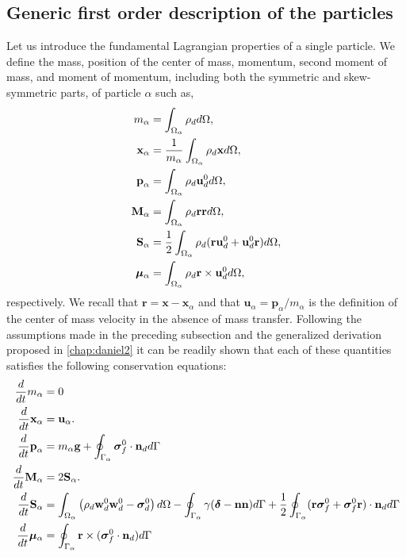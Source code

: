 
\subsection{Generic first order description of the particles}

Let us introduce the fundamental Lagrangian properties of a single particle. 
We define the mass, position of the center of mass, momentum, second moment of mass, and moment of momentum, including both the symmetric and skew-symmetric parts, of particle $\alpha$ such as, 
\begin{align}
    m_\alpha
    &= \intO{ \rho_d  },\\
    \textbf{x}_\alpha
    &= \frac{1}{m_\alpha }\intO{ \rho_d \textbf{x} },\\
    \textbf{p}_\alpha 
    &= \intO{ \rho_d \textbf{u}_d^0 },\\
    \textbf{M}_\alpha 
    &= \intO{ \rho_d \textbf{rr} }, \\
    \textbf{S}_\alpha 
    &= \frac{1}{2}\intO{ \rho_d (\textbf{r}\textbf{u}_d^0+\textbf{u}_d^0\textbf{r}) },\\
    \bm\mu_\alpha 
    &= \intO{ \rho_d \textbf{r}\times\textbf{u}_d^0 },
    \label{eq:position_and_momentum_def}
\end{align}
respectively. 
We recall that $\textbf{r} = \textbf{x} - \textbf{x}_\alpha$ and that $\textbf{u}_\alpha = \textbf{p}_\alpha /m_\alpha$ is the definition of the center of mass velocity in the absence of mass transfer. 
Following the assumptions made in the preceding subsection and the generalized derivation proposed in \ref{chap:daniel2} it can be readily shown that each of these quantities satisfies the following conservation equations:
\begin{align}
    \label{eq:dt_m_alpha}
    \ddt m_\alpha
    &= 
    0\\
    \ddt {\textbf{x}_\alpha}
    &=\textbf{u}_\alpha. 
    \label{eq:dt_x_alpha}\\
    \label{eq:dt_p_alpha}
    \ddt \textbf{p}_\alpha
    &= 
    m_\alpha\textbf{g}
    +  \intS{\bm{\sigma}_f^0 \cdot \textbf{n}_d}\\
    \ddt {\textbf{M}_\alpha}
    &=2\textbf{S}_\alpha. 
    \label{eq:dt_M_alpha}
    \\
    \ddt {\textbf{S}_\alpha}
    &= \intO{ \left(
        \rho_d  \textbf{w}_d^0 \textbf{w}_d^0 
        - \bm{\sigma}_d^0
    \right) }
    - \intS{ 
        \gamma (\bm\delta - \textbf{nn})
    }
    + \frac{1}{2}\intS{ (\textbf{r}\bm{\sigma}_f^0+\bm{\sigma}_f^0\textbf{r})\cdot \textbf{n}_d} 
    \label{eq:dt_S_alpha}\\
    \ddt {\bm\mu_\alpha}
    &=
     \intS{ \textbf{r}\times(\bm{\sigma}_f^0\cdot \textbf{n}_d)} 
    \label{eq:dt_mu_alpha}
\end{align}
